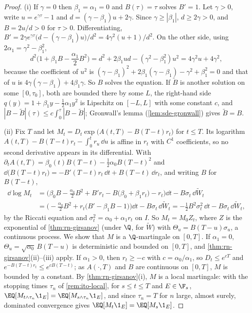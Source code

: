 \begin{proof}
(i) If $\gamma=0$ then $\beta_1=\alpha_1=0$ and $B(\tau)=\tau$ solves $B'=1$. Let $\gamma>0$, write
$u=e^{\gamma\tau}-1$ and $d=(\gamma-\beta_1)u+2\gamma$. Since $\gamma\ge|\beta_1|$, $d\ge2\gamma>0$, and
$B=2u/d>0$ for $\tau>0$. Differentiating, $B'=2\gamma e^{\gamma\tau}\big(d-(\gamma-\beta_1)u\big)/d^2=
4\gamma^2(u+1)/d^2$. On the other side, using $2\alpha_1=\gamma^2-\beta_1^2$,
\[
  d^2\Big(1+\beta_1B-\frac{\alpha_1}2B^2\Big)=d^2+2\beta_1ud-(\gamma^2-\beta_1^2)u^2
  =4\gamma^2u+4\gamma^2 ,
\]
because the coefficient of $u^2$ is $(\gamma-\beta_1)^2+2\beta_1(\gamma-\beta_1)-\gamma^2+\beta_1^2=0$ and
that of $u$ is $4\gamma(\gamma-\beta_1)+4\beta_1\gamma$. So $B$ solves the equation. If $\tilde B$ is
another solution on some $[0,\tau_0]$, both are bounded there by some $L$, the right-hand side
$q(y)=1+\beta_1y-\frac12\alpha_1y^2$ is Lipschitz on $[-L,L]$ with some constant $c$, and
$|B-\tilde B|(\tau)\le c\int_0^\tau|B-\tilde B|$; Gronwall's lemma (\cref{lem:sde-gronwall}) gives
$\tilde B=B$.

(ii) Fix $T$ and let $M_t=D_t\exp\big(A(t,T)-B(T-t)r_t\big)$ for $t\le T$. Its logarithm
$A(t,T)-B(T-t)r_t-\int_0^tr_u\,\dd u$ is affine in $r_t$ with $C^1$ coefficients, so no second
derivative appears in its differential. With $\partial_tA(t,T)=\beta_0(t)B(T-t)-\frac12\alpha_0B(T-t)^2$
and $\dd\big(B(T-t)r_t\big)=-B'(T-t)r_t\,\dd t+B(T-t)\,\dd r_t$, and writing $B$ for $B(T-t)$,
\begin{align*}
  \dd\log M_t&=\Big(\beta_0B-\frac{\alpha_0}2B^2+B'r_t-B\big(\beta_0+\beta_1r_t\big)-r_t\Big)\dd t-B\sigma_t\,\dd\widetilde W_t\\
  &=\Big(-\frac{\alpha_0}2B^2+r_t\big(B'-\beta_1B-1\big)\Big)\dd t-B\sigma_t\,\dd\widetilde W_t
  =-\frac12B^2\sigma_t^2\,\dd t-B\sigma_t\,\dd\widetilde W_t ,
\end{align*}
by the Riccati equation and $\sigma_t^2=\alpha_0+\alpha_1r_t$ on $I$. So $M_t=M_0Z_t$, where $Z$ is the
exponential of \cref{thm:rn-girsanov} (under $\Q$, for $\widetilde W$) with
$\Theta_u=B(T-u)\sigma_u$, a continuous process. We show that $M$ is a $\Q$-martingale on $[0,T]$.
If $\alpha_1=0$, $\Theta_u=\sqrt{\alpha_0}\,B(T-u)$ is deterministic and bounded on $[0,T]$, and
\cref{thm:rn-girsanov}(ii)--(iii) apply. If $\alpha_1>0$, then $r_t\ge-c$ with $c=\alpha_0/\alpha_1$, so
$D_t\le e^{cT}$ and $e^{-B(T-t)r_t}\le e^{cB(T-t)}$; as $A(\cdot,T)$ and $B$ are continuous on
$[0,T]$, $M$ is bounded by a constant. By \cref{thm:rn-girsanov}(i), $M$ is a local martingale:
with the stopping times $\tau_n$ of \cref{rem:ito-local}, for $s\le t\le T$ and $E\in\F_s$,
$\EQ[M_{t\wedge\tau_n}\1_E]=\EQ[M_{s\wedge\tau_n}\1_E]$, and since $\tau_n=T$ for $n$ large, almost
surely, dominated convergence gives $\EQ[M_t\1_E]=\EQ[M_s\1_E]$.


\end{proof}
